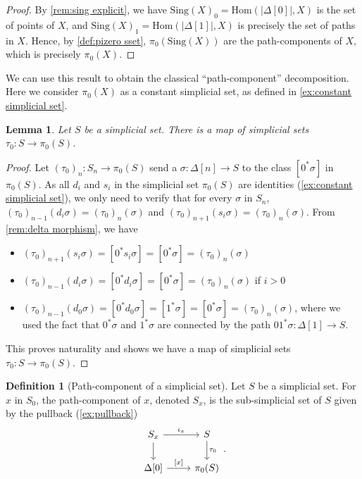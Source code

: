 \documentclass[11pt, a4paper]{amsart}
\newcommand{\Hom}{\mathrm{Hom}}
\newcommand{\Sing}{\mathrm{Sing}}
\newtheorem{lemma}[equation]{Lemma}
\theoremstyle{definition}
\newtheorem{definition}[equation]{Definition}
\theoremstyle{remark}
\numberwithin{equation}{section}
\begin{document}
\begin{proof}
 By \cref{rem:sing explicit}, we have $\Sing(X)_0= \Hom(|\Delta[0]|,X)$ is the set of points of $X$, and $\Sing(X)_1 = \Hom(|\Delta[1]|,X)$ is precisely the set of paths in $X$. Hence, by \cref{def:pizero sset}, $\pi_0(\Sing(X))$ are the path-components of $X$, which is precisely $\pi_0(X)$.
\end{proof}

We can use this result to obtain the classical ``path-component'' decomposition. Here we consider $\pi_0(X)$ as a constant simplicial set, as defined in \cref{ex:constant simplicial set}.

\begin{lemma}
 Let $S$ be a simplicial set. There is a map of simplicial sets $\tau_0\colon S \to \pi_0(S)$.
\end{lemma}

\begin{proof}
 Let $(\tau_0)_n\colon S_n \to \pi_0(S)$ send a $\sigma\colon \Delta[n] \to S$ to the class $[0^*\sigma]$ in $\pi_0(S)$. As all $d_i$ and $s_i$ in the simplicial set $\pi_0(S)$ are identities (\cref{ex:constant simplicial set}), we only need to verify that for every $\sigma$ in $S_n$, $(\tau_0)_{n-1}(d_i\sigma) = (\tau_0)_{n}(\sigma)$ and $(\tau_0)_{n+1}(s_i\sigma) = (\tau_0)_{n}(\sigma)$. From \cref{rem:delta morphism}, we have
 \begin{itemize}[leftmargin=*]
  \item $(\tau_0)_{n+1}(s_i\sigma) = [0^*s_i\sigma] = [0^*\sigma] = (\tau_0)_{n}(\sigma)$
  \item $(\tau_0)_{n-1}(d_i\sigma) = [0^*d_i\sigma] = [0^*\sigma] = (\tau_0)_{n}(\sigma)$ if $i > 0$
  \item $(\tau_0)_{n-1}(d_0\sigma) = [0^*d_0\sigma] = [1^*\sigma] = [0^*\sigma] = (\tau_0)_{n}(\sigma)$, where we used the fact that $0^*\sigma$ and $1^*\sigma$ are connected by the path $01^*\sigma\colon \Delta[1] \to S$.
 \end{itemize}
 This proves naturality and shows we have a map of simplicial sets $\tau_0\colon S \to \pi_0(S)$.
\end{proof}


\begin{definition}[Path-component of a simplicial set]
 Let $S$ be a simplicial set. For $x$ in $S_0$, the path-component of $x$, denoted $S_x$, is the sub-simplicial set of $S$ given by the pullback (\cref{ex:pullback})
 \[
 \begin{tikzcd}
 S_x \arrow[r, "\iota_x"] \arrow[d] & S \arrow[d, "\tau_0"] \\
 \Delta[0] \arrow[r, "{[x]}"] & \pi_0(S)
 \end{tikzcd}.
 \]  
\end{definition}
\end{document}

